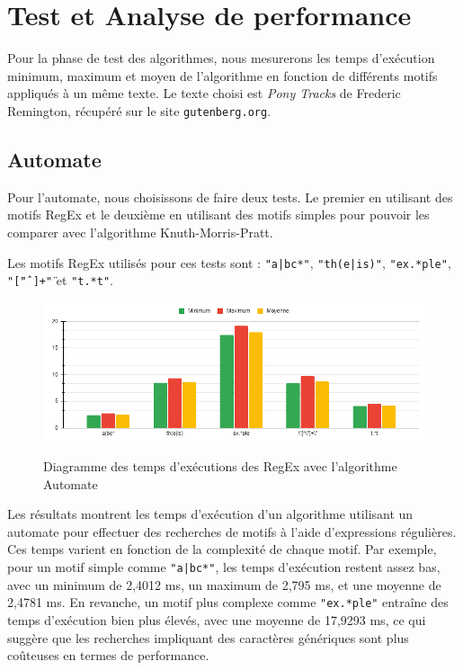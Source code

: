 \documentclass{article}
\begin{document}
\newpage
\section{Test et Analyse de performance}

Pour la phase de test des algorithmes, nous mesurerons les temps d'exécution minimum, maximum et moyen de l'algorithme en fonction de différents motifs appliqués à un même texte. Le texte choisi est \textit{Pony Tracks} de Frederic Remington, récupéré sur le site \texttt{gutenberg.org}.

\subsection{Automate}

Pour l’automate, nous choisissons de faire deux tests. Le premier en utilisant des motifs RegEx et le deuxième en utilisant des motifs simples pour pouvoir les comparer avec l’algorithme Knuth-Morris-Pratt.

Les motifs RegEx utilisés pour ces tests sont : \texttt{"a|bc*"}, \texttt{"th(e|is)"}, \texttt{"ex.*ple"}, \texttt{"\"[\^  " ]+\""} et \texttt{"t.*t"}.

\begin{figure}[ht] %
    \centering
    \includegraphics[width=1\textwidth]{./ressources/test_automate_regex.png}
    \caption{Diagramme des temps d'exécutions des RegEx avec l'algorithme Automate}
    \cite{test_automate_regex}
    \label{fig:test_automate_regex}
\end{figure}

Les résultats montrent les temps d'exécution d'un algorithme utilisant un automate pour effectuer des recherches de motifs à l'aide d'expressions régulières. Ces temps varient en fonction de la complexité de chaque motif. Par exemple, pour un motif simple comme \texttt{"a|bc*"}, les temps d'exécution restent assez bas, avec un minimum de 2,4012 ms, un maximum de 2,795 ms, et une moyenne de 2,4781 ms. En revanche, un motif plus complexe comme \texttt{"ex.*ple"} entraîne des temps d'exécution bien plus élevés, avec une moyenne de 17,9293 ms, ce qui suggère que les recherches impliquant des caractères génériques sont plus coûteuses en termes de performance.
\end{document}
